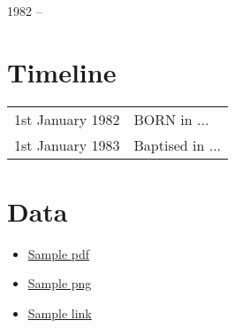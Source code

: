 \begin{center}
\huge{1982 --}
\end{center}

\vspace{1in}

\begin{center}
\end{center}

\newpage
\section{Timeline}
\begin{table}[h]
\renewcommand\arraystretch{1.4}
\begin{tabular}{@{\,}r <{\hskip 2pt} !{\foo} >{\raggedright\arraybackslash}p{20cm}}
\addlinespace[1.5ex]
1st January 1982 & BORN in ...\\
1st January 1983 & Baptised in ... \\
\end{tabular}
\end{table}

\section{Data}
\begin{itemize}
\item \href{run:people/Child1/sample.pdf}{Sample pdf}
\item \href{run:people/Child1/sample.png}{Sample png}
\item \href{https://github.com/StevenElsworth?tab=repositories}{Sample link} 
\end{itemize}